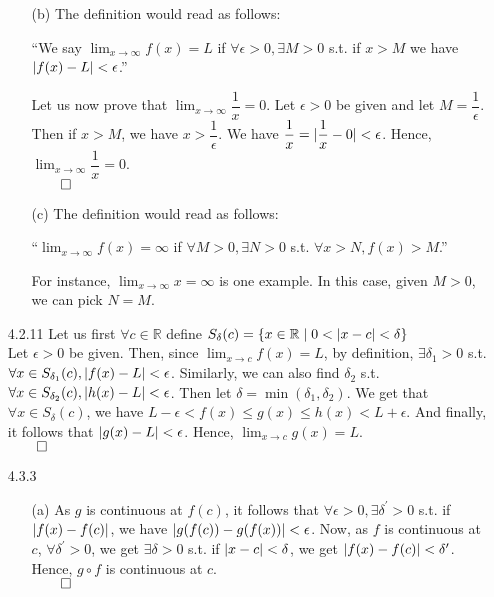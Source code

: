 \documentclass[11pt]{article}
\DeclarePairedDelimiter\abs{\lvert}{\rvert}%
\newcommand{\reals}{\mathbb{R}}
\begin{document}
\begin{itemize}
\begin{itemize}
            \item[(b)]
                The definition would read as follows:

                ``We say $\lim_{x \to \infty} f(x) = L$ if $\forall \epsilon >
                0, \exists M > 0$ s.t. if $x > M$ we have $\abs{f(x) - L} <
                \epsilon$.''

                Let us now prove that $\lim_{x \to \infty} \dfrac{1}{x} = 0$.
                Let $\epsilon > 0$ be given and let $M = \dfrac{1}{\epsilon}$.
                Then if $x > M$, we have $x > \dfrac{1}{\epsilon}$. We have
                $\dfrac{1}{x} = \abs{\dfrac{1}{x} - 0} < \epsilon$. Hence,
                $\lim_{x \to \infty} \dfrac{1}{x} = 0$.\\
                $\qed$

            \item[(c)]
                The definition would read as follows:

                ``$\lim_{x \to \infty} f(x) = \infty$ if $\forall M > 0,
                \exists N > 0$ s.t. $\forall x > N, f(x) > M$.''

                For instance, $\lim_{x \to \infty} x = \infty$ is one example.
                In this case, given $M > 0$, we can pick $N = M$.
        \end{itemize}

    \item[4.2.11]
        Let us first $\forall c \in \reals$ define $S_\delta(c) = \{x \in
        \reals \mid 0 < \abs{x - c} < \delta\}$
        \\
        Let $\epsilon > 0$ be given. Then, since $\lim_{x \to c} f(x) = L$, by
        definition, $\exists \delta_1 > 0$ s.t. $\forall x \in S_{\delta_1}(c),
        \abs{f(x) - L} < \epsilon$. Similarly, we can also find $\delta_2$ s.t.
        $\forall x \in S_{\delta_2}(c), \abs{h(x) - L} < \epsilon$. Then let
        $\delta = \min{(\delta_1, \delta_2)}$. We get that $\forall x \in
        S_{\delta}(c)$, we have $L - \epsilon < f(x) \leq g(x) \leq h(x) < L +
        \epsilon$. And finally, it follows that $\abs{g(x) - L} < \epsilon$.
        Hence, $\lim_{x \to c}g(x) = L$.\\
        $\qed$

    \item[4.3.3]
        \begin{itemize} 
            \item[(a)]
                As $g$ is continuous at $f(c)$, it follows that $\forall
                \epsilon > 0, \exists \delta^\prime > 0$ s.t. if $\abs{f(x) -
                f(c)}$, we have $\abs{g(f(c)) - g(f(x))} < \epsilon$. Now, as
                $f$ is continuous at $c$, $\forall \delta^\prime > 0$, we get
                $\exists \delta > 0$ s.t. if $\abs{x - c} < \delta$, we get
                $\abs{f(x) - f(c)} < \delta^\prime$. Hence, $g \circ f$ is
                continuous at $c$.\\
                $\qed$


\end{itemize}
\end{itemize}
\end{document}
